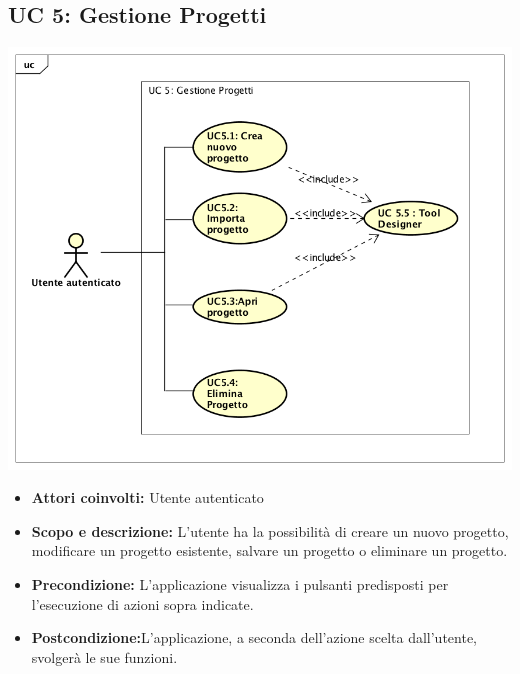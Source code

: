 \subsection{UC 5: Gestione Progetti}
		\centering
		\includegraphics[scale=0.7]{../../Casi D'uso/UC5.png}
\begin{itemize}
		\item \textbf{Attori coinvolti:} Utente autenticato \\
		\item \textbf{Scopo e descrizione:} L'utente ha la possibilità di creare un nuovo progetto, modificare un progetto esistente, salvare un progetto o eliminare un progetto. \\
		\item \textbf{Precondizione:} L’applicazione visualizza i pulsanti predisposti per l’esecuzione di azioni sopra indicate. \\
		\item \textbf{Postcondizione:}L’applicazione, a seconda dell’azione scelta dall’utente, svolgerà le sue funzioni. \\
\end{itemize}